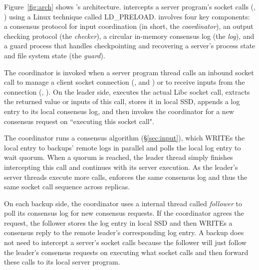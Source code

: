 Figure~\ref{fig:arch} shows \xxx's architecture. \xxx intercepts a server 
program's socket calls (\eg, \recv) using a Linux technique called LD\_PRELOAD. 
\xxx involves four key components: a \paxos consensus protocol for input 
coordination (in short, the \emph{coordinator}), an output checking protocol 
(the \emph{checker}), a circular in-memory consensus log (the 
\emph{log}), and a guard process that handles checkpointing and recovering a 
server's process state and file system state (the \emph{guard}).

The coordinator is invoked when a server program thread calls an inbound socket 
call to manage a client socket connection (\eg, \accept and \close) or to 
receive inputs from the connection (\eg, \recv). On the leader side, \xxx 
executes the actual Libc socket call, extracts the returned value or inputs of 
this call, stores it in local SSD, appends a log entry to its local consensus 
log, and then invokes the coordinator for a new consensus request on 
``executing this socket call".

The coordinator runs a consensus algorithm (\S\ref{sec:input}), which WRITEs 
the local entry to backups' remote logs in parallel and polls the local log 
entry to wait quorum. When a quorum is reached, the leader thread simply 
finishes intercepting this call and continues with its server execution. As 
the leader's server threads execute more calls, \xxx enforces the same 
consensus log and thus the same socket call sequence across replicas.



On each backup side, the coordinator uses a \xxx internal thread called 
\emph{follower} to poll its consensus log for new consensus requests. If the 
coordinator agrees the request, the follower stores the log entry in local SSD 
and then WRITEs a consensus reply to the remote leader's corresponding log 
entry. A backup does not need to intercept a server's socket calls because the 
follower will just follow the leader's consensus requests on executing what 
socket calls and then forward these calls to its local server program.

